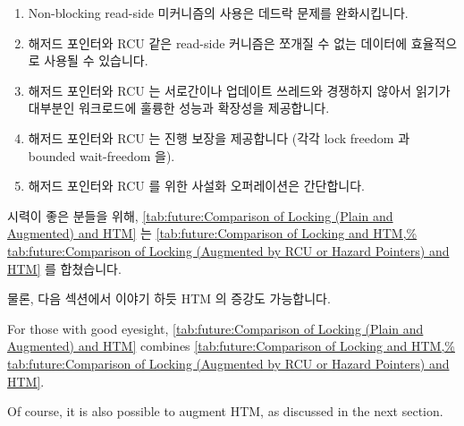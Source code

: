 \fi

\begin{enumerate}
\item	Non-blocking read-side 미커니즘의 사용은 데드락 문제를 완화시킵니다.
\item	해저드 포인터와 RCU 같은 read-side 커니즘은 쪼개질 수 없는 데이터에
	효율적으로 사용될 수 있습니다.
\item	해저드 포인터와 RCU 는 서로간이나 업데이트 쓰레드와 경쟁하지 않아서
	읽기가 대부분인 워크로드에 훌륭한 성능과 확장성을 제공합니다.
\item	해저드 포인터와 RCU 는 진행 보장을 제공합니다 (각각 lock freedom 과
	bounded wait-freedom 을).
\item	해저드 포인터와 RCU 를 위한 사설화 오퍼레이션은 간단합니다.

\iffalse

\item	Use of non-blocking read-side mechanisms alleviates deadlock issues.
\item	Read-side mechanisms such as hazard pointers and RCU can operate
	efficiently on non-partitionable data.
\item	Hazard pointers and RCU do not contend with each other or with
	updaters, allowing excellent performance and scalability for
	read-mostly workloads.
\item	Hazard pointers and RCU provide forward-progress guarantees
	(lock freedom and bounded wait-freedom, respectively).
\item	Privatization operations for hazard pointers and RCU are
	straightforward.

\fi

\end{enumerate}



시력이 좋은 분들을 위해,
\cref{tab:future:Comparison of Locking (Plain and Augmented) and HTM}
는
\cref{tab:future:Comparison of Locking and HTM,%
tab:future:Comparison of Locking (Augmented by RCU or Hazard Pointers) and HTM}
를 합쳤습니다.

물론, 다음 섹션에서 이야기 하듯 HTM 의 증강도 가능합니다.

\iffalse

For those with good eyesight,
\cref{tab:future:Comparison of Locking (Plain and Augmented) and HTM}
combines
\cref{tab:future:Comparison of Locking and HTM,%
tab:future:Comparison of Locking (Augmented by RCU or Hazard Pointers) and HTM}.

Of course, it is also possible to augment HTM,
as discussed in the next section.

